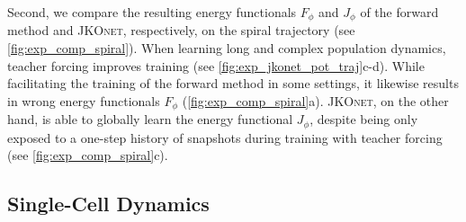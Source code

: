 Second, we compare the resulting energy functionals $F_\phi$ and $J_\phi$ of the forward method and \textsc{JKOnet}, respectively, on the spiral trajectory (see \cref{fig:exp_comp_spiral}).
When learning long and complex population dynamics, teacher forcing improves training (see \cref{fig:exp_jkonet_pot_traj}c-d).
While facilitating the training of the forward method in some settings, it likewise results in wrong energy functionals $F_\phi$ (\cref{fig:exp_comp_spiral}a).
\textsc{JKOnet}, on the other hand, is able to globally learn the energy functional $J_\phi$, despite being only exposed to a one-step history of snapshots during training with teacher forcing (see \cref{fig:exp_comp_spiral}c).

\subsection{Single-Cell Dynamics}
\label{sec:jkonet_cell}

